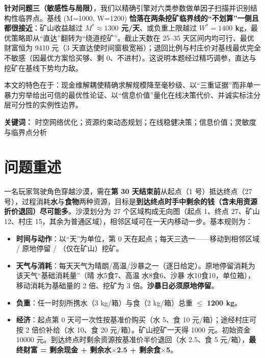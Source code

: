 \documentclass[12pt,a4paper]{ctexart}
\begin{document}
\textbf{针对问题三（敏感性与局限）}，我们以精确引擎对六类参数做单因子扫描并识别结构性临界点。基线 (M=1000, W=1200) \textbf{恰落在两条挖矿临界线的“不划算”一侧且都很接近}：矿山收益越过 \textbf{$M^*\approx 1300$ 元/天}、或负重上限越过 \textbf{$W^*=1400$ kg}，最优策略即从“直达”翻转为“绕道挖矿”。截止天数在 25–35 天区间内均可行、最优财富恒为 9410 元（3 天直达使时间窗极宽裕）；退回比例与村庄价对基线最优完全不敏感（因最优方案恰买够、剩 0、不进村）。这说明本题经过精巧调参，直达与挖矿在基线下势均力敌。

本文的特色在于：现金维解耦使精确求解规模降至毫秒级、以“三重证据”而非单一暴力穷举给出可信的最优性论证、以“信息价值”量化在线决策代价、并诚实标注分层可分性的实例性边界。

\vspace{1em}
\noindent\textbf{关键词：} 时空网络优化；资源约束动态规划；在线稳健决策；信息价值；灵敏度与临界点分析

\newpage
\tableofcontents
\newpage

\section{问题重述}

一名玩家驾驶角色穿越沙漠，需在\textbf{第 30 天结束前}从起点（1 号）抵达终点（27 号），过程消耗\textbf{水}与\textbf{食物}两种资源，目标是\textbf{到达终点时手中剩余的钱（含未用资源折价退回）尽可能多}。沙漠划分为 27 个区域构成无向图（起点 1、终点 27、矿山 12、村庄 15，其余为普通区域），相邻区域可在一天内移动一步。基本规则为：

\begin{itemize}
  \item \textbf{时间与动作}：以“天”为单位，第 0 天在起点；每天三选一——移动到相邻区域 / 原地停留 / （仅在矿山）挖矿。
  \item \textbf{天气与消耗}：每天天气为晴朗/高温/沙暴之一（逐日给定）。原地停留消耗为该天气“基础消耗量”（晴 水5食7、高温 水8食6、沙暴 水10食10，单位箱），移动消耗为基础量的 2 倍、挖矿为 3 倍。\textbf{沙暴日必须原地停留}。
  \item \textbf{负重}：任一时刻所携水（3 kg/箱）与食（2 kg/箱）总重 $\le$ \textbf{1200 kg}。
  \item \textbf{经济}：起点第 0 天可一次性按基准价购买（水 5、食 10 元/箱）；途经村庄可按 2 倍价补给（水 10、食 20 元/箱）。矿山挖矿一天得 1000 元。初始资金 10000 元。到达终点时剩余资源按基准价半价退回（水 2.5、食 5 元/箱），\textbf{最终财富 = 剩余现金 + 剩余水$\times$2.5 + 剩余食$\times$5}。
\end{itemize}
\end{document}
